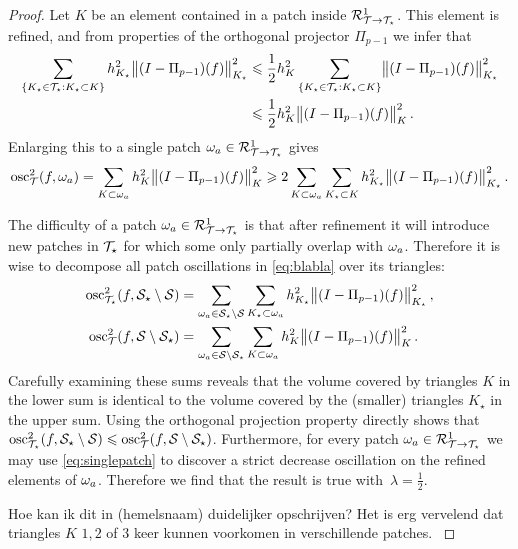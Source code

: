 \documentclass[thesis.tex]{subfiles}
\begin{document}
\begin{proof}
  Let $K$ be an element contained in a patch inside $\mathcal{R}^1_{\mathcal{T} \to \mathcal{T}_\star}$.
  This element is refined, and from properties of the orthogonal projector $\Pi_{p-1}$ we infer that
  \begin{align*}
    \sum_{\set{K_\star \in \mathcal{T}_\star : K_\star \subset K}} h^2_{K_\star} \norm{(I - \Pi_{p-1})(f)}^2_{K_\star} &\leqslant \frac{1}{2}h^2_K \sum_{\set{K_\star \in \mathcal{T}_\star : K_\star \subset K}} \norm{(I - \Pi_{p-1})(f)}^2_{K_\star} \\
    &\leqslant \frac{1}{2} h^2_K \norm{(I - \Pi_{p-1})(f)}^2_K.
  \end{align*}
  Enlarging this to a single patch $\omega_a \in \mathcal{R}^1_{\mathcal{T} \to \mathcal{T}_\star}$ gives
  \begin{equation}
    \label{eq:singlepatch}
    \operatorname{osc}_{\mathcal{T}}^2(f, \omega_a) = \sum_{K \subset \omega_a} h_K^2\norm{(I-\Pi_{p-1})(f)}_K^2 \geqslant 2 \sum_{K \subset \omega_a} \sum_{K_\star \subset K}h^2_{K_\star} \norm{(I-\Pi_{p-1})(f)}^2_{K_\star}.
  \end{equation}
  
  The difficulty of a patch  $\omega_a \in \mathcal{R}^1_{\mathcal{T} \to \mathcal{T}_\star}$ is that after refinement it will introduce new patches in $\mathcal{T}_\star$ for which
  some only partially overlap with $\omega_a$. Therefore it is wise to decompose all patch oscillations in \eqref{eq:blabla} over its triangles:
  \begin{align*}
    \operatorname{osc}_{\mathcal{T}_\star}^2(f, \mathcal{S}_\star \setminus \mathcal{S})  &= \sum_{\omega_a \in \mathcal{S}_\star \setminus \mathcal{S}} \sum_{K_\star \subset \omega_a} h_{K_\star}^2 \norm{(I-\Pi_{p-1})(f)}^2_{K_\star}, \\
    \operatorname{osc}_{\mathcal{T}}^2(f, \mathcal{S} \setminus \mathcal{S}_\star)  &= \sum_{\omega_a \in \mathcal{S} \setminus \mathcal{S}_\star} \sum_{K \subset \omega_a} h_{K}^2 \norm{(I-\Pi_{p-1})(f)}^2_{K}.
  \end{align*}
  Carefully examining these sums reveals that the volume covered by triangles $K$ in the lower sum is identical to the volume covered by the (smaller) triangles $K_\star$ in the
  upper sum. Using  the orthogonal projection property directly shows that $\operatorname{osc}_{\mathcal{T}_\star}^2(f, \mathcal{S}_\star \setminus \mathcal{S}) \leqslant \operatorname{osc}_{\mathcal{T}}^2(f, \mathcal{S}\setminus \mathcal{S}_\star)$. Furthermore,
  for every patch $\omega_a \in \mathcal{R}^1_{\mathcal{T} \to \mathcal{T}_\star}$ we may use \eqref{eq:singlepatch} to discover a strict decrease oscillation on the  refined elements of $\omega_a$.
  Therefore we find that the result is true with~$\lambda = \frac{1}{2}$.

  {
    \color{blue}
    Hoe kan ik dit in (hemelsnaam) duidelijker opschrijven? Het is erg vervelend dat triangles $K$ $1,2$ of $3$ keer kunnen voorkomen in verschillende patches.
}
\end{proof}
\end{document}

